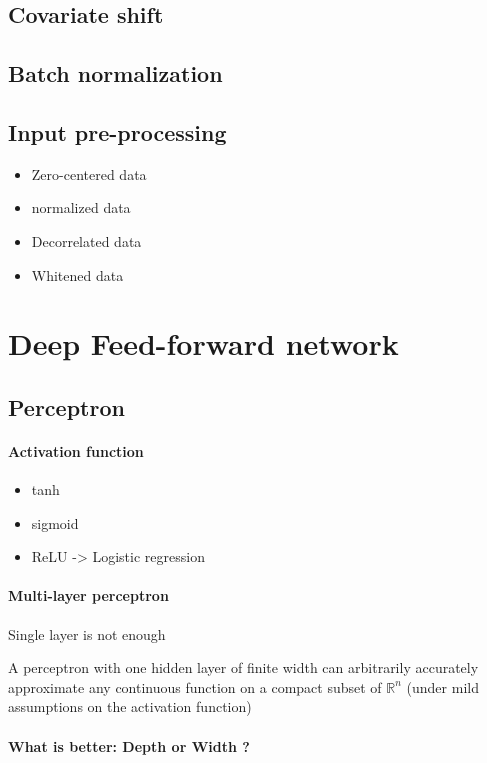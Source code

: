 	\subsection{Covariate shift}

	\subsection{Batch normalization}

	\subsection{Input pre-processing}
		\begin{itemize}
			\item Zero-centered data
			\item normalized data
			\item Decorrelated data
			\item Whitened data
		\end{itemize}
\section{Deep Feed-forward network}
	\subsection{Perceptron}
		\paragraph*{Activation function}
			\begin{itemize}
				\item tanh
				\item sigmoid
				\item ReLU -> Logistic regression
		\end{itemize}

		\paragraph*{Multi-layer perceptron}
			Single layer is not enough
			\begin{theorem}
				A perceptron with one hidden layer of finite width can arbitrarily accurately approximate any continuous function on a compact
				subset of $\mathbb{R}^n$ (under mild assumptions on the activation function)
			\end{theorem}

		\paragraph*{What is better: Depth or Width ?}

